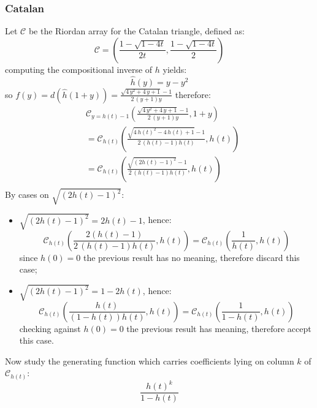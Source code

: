 \subsubsection{Catalan}
Let $\mathcal{C}$ be the Riordan array for the Catalan triangle,
defined as:
\begin{displaymath} 
    \mathcal{C} = \left(\frac{1-\sqrt{1-4t}}{2t}, \frac{1-\sqrt{1-4t}}{2}  \right)
\end{displaymath} 
computing the compositional inverse of $h$ yields:
\begin{displaymath} 
    \hat{h}(y) = y - y^2
\end{displaymath} 
so $f(y)=d(\hat{h}(1+y))=\frac{\sqrt{4 \, y^{2} + 4 \, y + 1} - 1}{2 \, {\left(y + 1\right)} y}$ therefore:
\begin{displaymath} 
    \begin{split} 
        &\mathcal{C}_{y=h(t)-1}\left(\frac{\sqrt{4 \, y^{2} + 4 \, y + 1} - 1}{2 \, {\left(y + 1\right)} y}, 1+y \right) \\
        &= \mathcal{C}_{h(t)}\left(\frac{\sqrt{4 \, h\left(t\right)^{2} - 4 \, h\left(t\right) + 1} - 1}{2 \, {\left(h\left(t\right) - 1\right)} h\left(t\right)}, h(t) \right)\\
        &= \mathcal{C}_{h(t)}\left(\frac{\sqrt{(2 h\left(t\right) -  1)^2} - 1}{2 \, {\left(h\left(t\right) - 1\right)} h\left(t\right)}, h(t) \right)\\
    \end{split} 
\end{displaymath} 
By cases on $\sqrt{(2 h\left(t\right) -  1)^2}$:
\begin{itemize}
    \item $\sqrt{(2 h\left(t\right) -  1)^2}=2 h\left(t\right) -  1$, hence:
        \begin{displaymath} 
            \mathcal{C}_{h(t)}\left(\frac{2(h\left(t\right) -  1)}{2 \, {\left(h\left(t\right) - 1\right)} h\left(t\right)}, h(t) \right)=
            \mathcal{C}_{h(t)}\left(\frac{1}{h\left(t\right)}, h(t) \right)
        \end{displaymath} 
        since $h(0)=0$ the previous result has no meaning, therefore discard this case;
    \item $\sqrt{(2 h\left(t\right) -  1)^2}=1 -2 h\left(t\right)$, hence:
        \begin{displaymath} 
            \mathcal{C}_{h(t)}\left(\frac{h\left(t\right)}{ {\left(1-h\left(t\right) \right)} h\left(t\right)}, h(t) \right)=
            \mathcal{C}_{h(t)}\left(\frac{1}{1-h\left(t\right)}, h(t) \right)
        \end{displaymath} 
        checking against $h(0)=0$ the previous result has meaning, therefore accept this case.
\end{itemize}
Now study the generating function which carries coefficients lying on column $k$
of $\mathcal{C}_{h(t)}$:
\begin{displaymath} 
    \frac{h(t)^{k}}{1-h\left(t\right)} 
\end{displaymath} 


